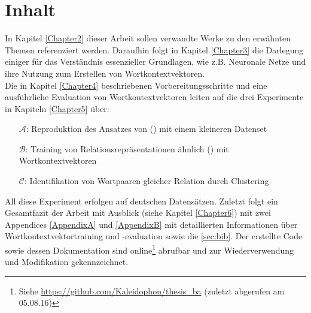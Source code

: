 \section{Inhalt}

In Kapitel \ref{Chapter2} dieser Arbeit sollen verwandte Werke zu den erwähnten Themen referenziert werden.
Daraufhin folgt in Kapitel \ref{Chapter3} die Darlegung einiger für das Verständnis essenzieller Grundlagen, wie z.B.
Neuronale Netze und ihre Nutzung zum Erstellen von Wortkontextvektoren.\\
Die in Kapitel \ref{Chapter4} beschriebenen Vorbereitungsschritte und eine ausführliche Evaluation von Wortkontextvektoren
leiten auf die drei Experimente in Kapiteln \ref{Chapter5} über:
\begin{itemize}
  \item[$\mathcal{A}$:] Reproduktion des Ansatzes von (\cite{bordes2013translating}) mit einem kleineren Datenset
  \item[$\mathcal{B}$:] Training von Relationsrepräsentationen ähnlich (\cite{bordes2013translating}) mit Wortkontextvektoren
  \item[$\mathcal{C}$:] Identifikation von Wortpaaren gleicher Relation durch Clustering
\end{itemize}

All diese Experiment erfolgen auf deutschen Datensätzen.
Zuletzt folgt ein Gesamtfazit der Arbeit mit Ausblick (siehe Kapitel \ref{Chapter6}) mit zwei Appendices \ref{AppendixA}
und \ref{AppendixB} mit detaillierten Informationen über Wortkontextvektortraining und -evaluation sowie die
\ref{sec:bib}. Der erstellte Code sowie dessen Dokumentation sind online\footnote{Siehe
\url{https://github.com/Kaleidophon/thesis_ba} (zuletzt abgerufen am 05.08.16)} abrufbar und zur Wiederverwendung
und Modifikation gekennzeichnet.
